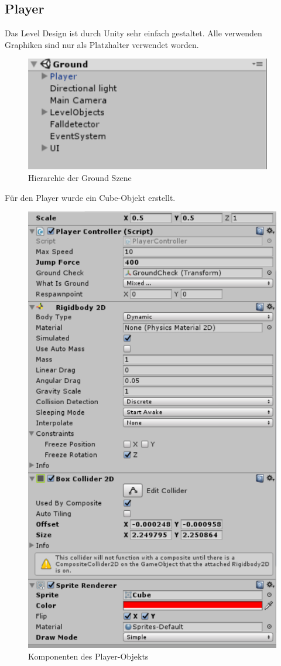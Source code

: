 \subsection{Player}
Das Level Design ist durch Unity sehr einfach gestaltet. Alle verwenden Graphiken sind nur als Platzhalter verwendet worden.
\begin{figure}[H]
	\includegraphics[height=5cm]{images/Ground.png}
	\caption{Hierarchie der Ground Szene}
\end{figure}
Für den Player wurde ein Cube-Objekt erstellt.
\begin{figure}[H]
	\includegraphics{images/Player.png}
	\caption{Komponenten des Player-Objekts}
\end{figure}
